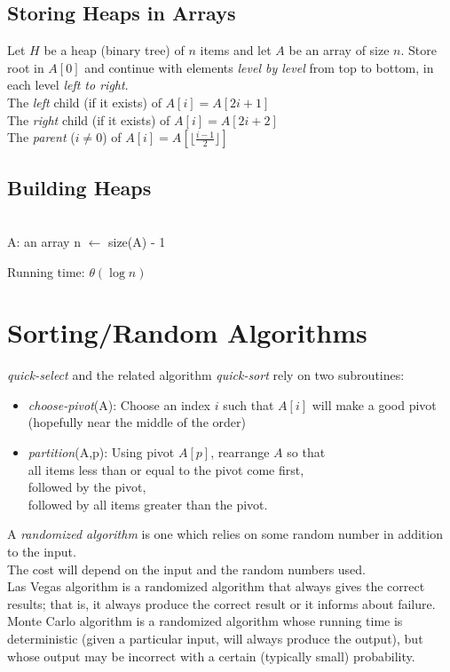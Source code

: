 \documentclass[12pt]{article}
\theoremstyle{definition}
\begin{document}
\subsection{Storing Heaps in Arrays}
Let $H$ be a heap (binary tree) of $n$ items and let $A$ be an array of size $n$.
Store root in $A[0]$ and continue with elements \emph{level by level} from top to bottom, in each level \emph{left to right}. \\
The \emph{left} child (if it exists) of $A[i] = A[2i + 1]$ \\
The \emph{right} child (if it exists) of $A[i] = A[2i + 2]$ \\
The \emph{parent} ($i \not = 0$) of $A[i] = A[\lfloor \frac{i-1}{2} \rfloor]$ \\

\subsection{Building Heaps}
\begin{algorithmic}
   \\
  A: an array
  \State n $\leftarrow$ size(A) - 1
    \State {}
  \EndFor
  \EndFunction
\end{algorithmic}
Running time: $\theta(\log n)$

\section{Sorting/Random Algorithms}
\emph{quick-select} and the related algorithm \emph{quick-sort} rely on two subroutines:
\begin{itemize}
  \item \emph{choose-pivot}(A): Choose an index $i$ such that $A[i]$ will make a good pivot (hopefully near the middle of the order)
  \item \emph{partition}(A,p): Using pivot $A[p]$, rearrange $A$ so that \\
  all items less than or equal to the pivot come first, \\
  followed by the pivot, \\
  followed by all items greater than the pivot.
\end{itemize}

A \emph{randomized algorithm} is one which relies on some random number in addition to the input. \\
The cost will depend on the input and the random numbers used. \\
Las Vegas algorithm is a randomized algorithm that always gives the correct results; that is, it always produce the correct result or it informs about failure. \\
Monte Carlo algorithm is a randomized algorithm whose running time is deterministic (given a particular input, will always produce the output), but whose output may be incorrect with a certain (typically small) probability.
\end{document}
